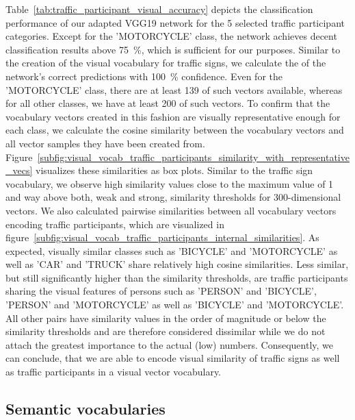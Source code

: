 Table~\ref{tab:traffic_participant_visual_accuracy} depicts the classification performance of our adapted VGG19 network for the \num{5} selected traffic participant categories.
Except for the 'MOTORCYCLE' class, the network achieves decent classification results above \SI{75}{\percent}, which is sufficient for our purposes.
Similar to the creation of the visual vocabulary for traffic signs, we calculate the of the network's correct predictions with \SI{100}{\percent} confidence.
Even for the 'MOTORCYCLE' class, there are at least \num{139} of such vectors available, whereas for all other classes, we have at least \num{200} of such vectors.
To confirm that the vocabulary vectors created in this fashion are visually representative enough for each class, we calculate the cosine similarity between the vocabulary vectors and all vector samples they have been created from.
Figure~\ref{subfig:visual_vocab_traffic_participants_similarity_with_representative_vecs} visualizes these similarities as box plots.
Similar to the traffic sign vocabulary, we observe high similarity values close to the maximum value of \num{1} and way above both, weak and strong, similarity thresholds for \num{300}-dimensional vectors.
We also calculated pairwise similarities between all vocabulary vectors encoding traffic participants, which are visualized in figure~\ref{subfig:visual_vocab_traffic_participants_internal_similarities}.
As expected, visually similar classes such as 'BICYCLE' and 'MOTORCYCLE' as well as 'CAR' and 'TRUCK' share relatively high cosine similarities.
Less similar, but still significantly higher than the similarity thresholds, are traffic participants sharing the visual features of persons such as 'PERSON' and 'BICYCLE', 'PERSON' and 'MOTORCYCLE' as well as 'BICYCLE' and 'MOTORCYCLE'.
All other pairs have similarity values in the order of magnitude or below the similarity thresholds and are therefore considered dissimilar while we do not attach the greatest importance to the actual (low) numbers.
Consequently, we can conclude, that we are able to encode visual similarity of traffic signs as well as traffic participants in a visual vector vocabulary.

\subsection{Semantic vocabularies}%
\label{subsec:semantic_vocabularies}

